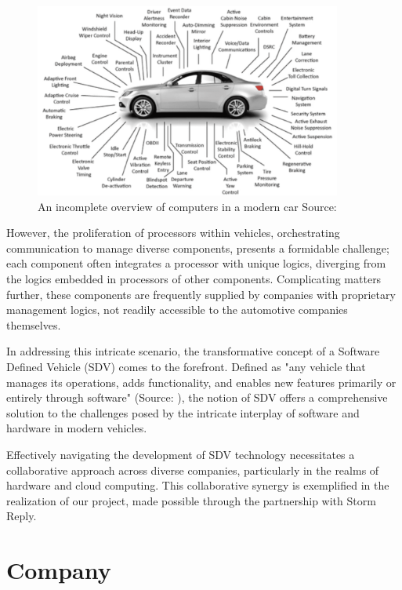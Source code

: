 \begin{figure}[h]  %
  \centering
  \includegraphics[width=0.9\textwidth]{images/vehicle_processors.png}  %
  \caption{An incomplete overview of computers in a modern car Source: \cite{ieeeSoftwareDefinedVehicle}}
  \label{fig:VheicleProcessors}
\end{figure}

However, the proliferation of processors within vehicles, orchestrating communication to manage diverse components, presents a formidable challenge; each component often integrates a processor with unique logics, diverging from the logics embedded in processors of other components. Complicating matters further, these components are frequently supplied by companies with proprietary management logics, not readily accessible to the automotive companies themselves.

In addressing this intricate scenario, the transformative concept of a Software Defined Vehicle (SDV) comes to the forefront. Defined as "any vehicle that manages its operations, adds functionality, and enables new features primarily or entirely through software" (Source: \cite{blackberrySDV}), the notion of SDV offers a comprehensive solution to the challenges posed by the intricate interplay of software and hardware in modern vehicles.

Effectively navigating the development of SDV technology necessitates a collaborative approach across diverse companies, particularly in the realms of hardware and cloud computing. This collaborative synergy is exemplified in the realization of our project, made possible through the partnership with Storm Reply.


\section{Company}

